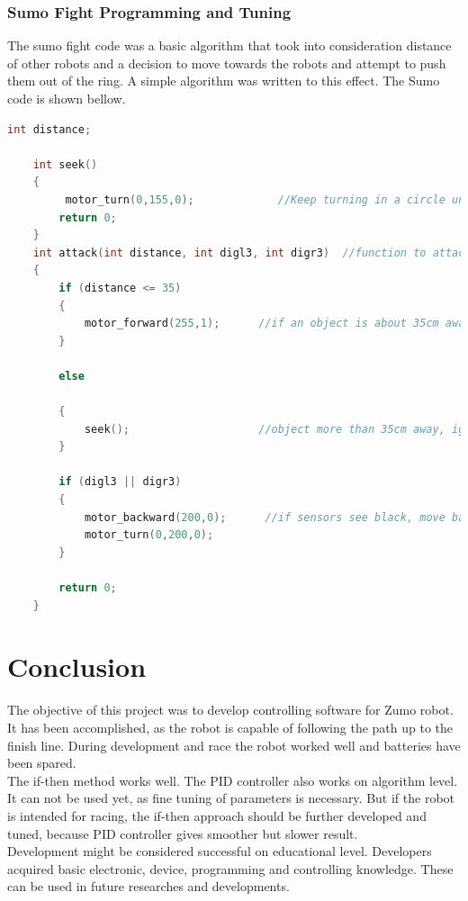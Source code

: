 \documentclass[11pt,a4paper,oneside,article]{memoir}
\begin{document}
\subsection{Sumo Fight Programming and Tuning}
The sumo fight code was a basic algorithm that took into consideration distance of other robots and a decision to move towards the robots and attempt to push them out of the ring. A simple algorithm was written to this effect. The Sumo code is shown bellow. 
\vspace{-22pt}\begin{lstlisting}[language=C,caption={Sumo},label=Sumofight]
int distance;
 
    int seek()
    { 
         motor_turn(0,155,0);             //Keep turning in a circle until
        return 0;
    }
    int attack(int distance, int digl3, int digr3)  //function to attack objects at a certain distance
    {
        if (distance <= 35)
        {
            motor_forward(255,1);      //if an object is about 35cm away or less, move towards it   
        }
        
        else
            
        { 
            seek();                    //object more than 35cm away, ignore and keep searching
        }
        
        if (digl3 || digr3) 
        {
            motor_backward(200,0);      //if sensors see black, move backwards and turn
            motor_turn(0,200,0);
        }
           
        return 0;
    }
\end{lstlisting}\vspace{-22pt}


\chapter{Conclusion}
The objective of this project was to develop controlling software for Zumo robot. It has been accomplished, as the robot is capable of following the path up to the finish line. During development and race the robot worked well and batteries have been spared.\\
The if-then method works well. The PID controller also works on algorithm level. It can not be used yet, as fine tuning of parameters is necessary. But if the robot is intended for racing, the if-then approach should be further developed and tuned, because PID controller gives smoother but slower result.\\
Development might be considered successful on educational level. Developers acquired basic electronic, device, programming and controlling knowledge. These can be used in future researches and developments.
\end{document}
